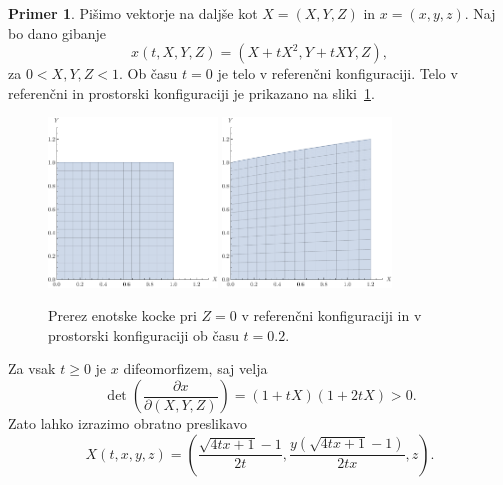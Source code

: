 \documentclass[12pt,a4paper,twoside]{article}
\theoremstyle{definition} %
\newtheorem{primer}[definicija]{Primer}
\theoremstyle{plain} %
\numberwithin{equation}{section}
\newcommand{\dpar}[2]{\ensuremath{\frac{\partial #1}{\partial #2}}}
\newcommand{\vX}{X}
\newcommand{\vx}{x}
\begin{document}
\begin{primer}
  \label{prim:gib}
  Pišimo vektorje na daljše kot $\vX = (X,Y,Z)$ in $\vx = (x, y, z)$.
  Naj bo dano gibanje \[
  \vx(t, X, Y, Z) = (X + t X^2, Y + t X Y, Z), \]
  za $0 <
  X, Y, Z < 1$.  Ob času $t=0$ je telo v referenčni konfiguraciji. Telo v referenčni
  in prostorski konfiguraciji je prikazano na sliki~\ref{fig:gibanje}.
  \begin{figure}[h]
    \centering
    \includegraphics[width=0.4\textwidth]{images/gibanje0.pdf}
    \hspace{1em}
    \includegraphics[width=0.4\textwidth]{images/gibanje02.pdf}
    \caption{Prerez enotske kocke pri $Z = 0$ v referenčni konfiguraciji in v prostorski
    konfiguraciji ob času $t=0.2$.}
    \label{fig:gibanje}
  \end{figure}
  Za vsak $t\geq 0$ je $\vx$ difeomorfizem, saj velja
  \[ \det\left( \dpar{\vx}{(X, Y, Z)} \right) = (1+tX)(1+2tX) > 0. \]
  Zato lahko izrazimo obratno preslikavo
  \begin{equation}
    \vX(t, x, y, z) = \left(\frac{\sqrt{4 t x+1}-1}{2 t},\frac{y
    \left(\sqrt{4 t x+1}-1\right)}{2 t x}, z\right).
    \label{eq:gibanje-inv}
  \end{equation}
\end{primer}
\end{document}

